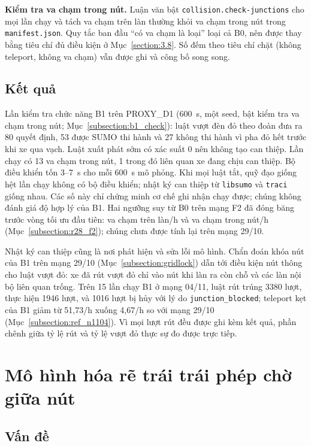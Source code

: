 \documentclass[../main.tex]{subfiles}
\begin{document}
\textbf{Kiểm tra va chạm trong nút.} Luận văn bật \texttt{collision.check-junctions} cho mọi lần chạy và tách va chạm trên làn thường khỏi va chạm trong nút trong \texttt{manifest.json}. Quy tắc ban đầu ``có va chạm là loại'' loại cả B0, nên được thay bằng tiêu chí đủ điều kiện ở Mục~\ref{section:3.8}. Số đếm theo tiêu chí chặt (không teleport, không va chạm) vẫn được ghi và công bố song song.

\subsection{Kết quả}

Lần kiểm tra chức năng B1 trên PROXY\_D1 (600~s, một seed, bật kiểm tra va chạm trong nút; Mục~\ref{subsection:b1_check}): luật vượt đèn đỏ theo đoàn đưa ra 80 quyết định, 53 được SUMO thi hành và 27 không thi hành vì pha đỏ hết trước khi xe qua vạch. Luật xuất phát sớm có xác suất 0 nên không tạo can thiệp. Lần chạy có 13 va chạm trong nút, 1 trong đó liên quan xe đang chịu can thiệp. Bộ điều khiển tốn 3--7~s cho mỗi 600~s mô phỏng. Khi mọi luật tắt, quỹ đạo giống hệt lần chạy không có bộ điều khiển; nhật ký can thiệp từ \texttt{libsumo} và \texttt{traci} giống nhau. Các số này chỉ chứng minh cơ chế ghi nhận chạy được; chúng không đánh giá độ hợp lý của B1. Hai ngưỡng suy từ B0 trên mạng F2 đã đóng băng trước vòng tối ưu đầu tiên:  va chạm trên làn/h và  va chạm trong nút/h (Mục~\ref{subsection:r28_f2}); chúng chưa được tính lại trên mạng 29/10.

Nhật ký can thiệp cũng là nơi phát hiện và sửa lỗi mô hình. Chẩn đoán khóa nút của B1 trên mạng 29/10 (Mục~\ref{subsection:gridlock}) dẫn tới điều kiện nút thông cho luật vượt đỏ: xe đã rút vượt đỏ chỉ vào nút khi làn ra còn chỗ và các làn nội bộ liên quan trống. Trên 15 lần chạy B1 ở mạng 04/11, luật rút trúng 3380 lượt, thực hiện 1946 lượt, và 1016 lượt bị hủy với lý do \texttt{junction\_blocked}; teleport kẹt của B1 giảm từ 51,73/h xuống 4,67/h so với mạng 29/10 (Mục~\ref{subsection:ref_n1104}). Vì mọi lượt rút đều được ghi kèm kết quả, phần chênh giữa tỷ lệ rút và tỷ lệ vượt đỏ thực sự đo được trực tiếp.

\section{Mô hình hóa rẽ trái trái phép chờ giữa nút}
\label{section:5.3}

\subsection{Vấn đề}
\end{document}
